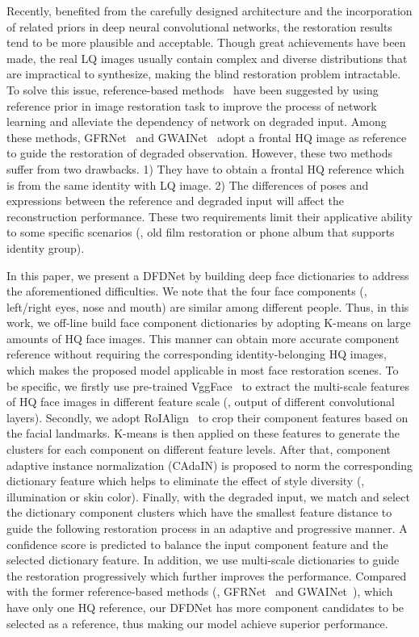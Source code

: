 \documentclass[runningheads]{llncs}
\begin{document}
Recently, benefited from the carefully designed architecture and the incorporation of related priors in deep neural convolutional networks, the restoration results tend to be more plausible and acceptable. Though great achievements have been made, the real LQ images usually contain complex and diverse distributions that are impractical to synthesize, making the blind restoration problem intractable.
To solve this issue, reference-based methods~\cite{li2018learning,dogan2019exemplar,wang2018recovering,zhang2019image} have been suggested by using reference prior in image restoration task to improve the process of network learning and alleviate the dependency of network on degraded input. 
Among these methods, GFRNet~\cite{li2018learning} and GWAINet~\cite{dogan2019exemplar} adopt a frontal HQ image as reference to guide the restoration of degraded observation. However, these two methods suffer from two drawbacks. 
1) They have to obtain a frontal HQ reference which is from the same identity with LQ image.
2) The differences of poses and expressions between the reference and degraded input will affect the reconstruction performance. 
These two requirements limit their applicative ability to some specific scenarios 
(\eg, old film restoration or phone album that supports identity group). 

In this paper, we present a DFDNet by building deep face dictionaries to address the aforementioned difficulties. 
We note that the four face components (\ie, left/right eyes, nose and mouth) are similar among different people. 
Thus, in this work, we  off-line build face component dictionaries by adopting K-means on large amounts of HQ face images. This manner can obtain more accurate component reference without requiring the corresponding identity-belonging HQ images, 
which makes the proposed model applicable in most face restoration scenes. 
To be specific, we firstly use pre-trained VggFace~\cite{cao2018vggface2} to extract the multi-scale features of HQ face images in different feature scale (\eg, output of different  convolutional layers). Secondly, we adopt RoIAlign~\cite{he2017mask} to crop their component features based on the facial landmarks. K-means is then applied on these features to generate the  clusters for each component on different feature levels. 
After that, component adaptive instance normalization (CAdaIN) is proposed to norm the corresponding dictionary feature which helps to eliminate the effect of style diversity (\ie, illumination or skin color).
Finally, with the degraded input, we match and select the dictionary component clusters which have the smallest feature distance to guide the following restoration process in an adaptive and progressive manner. 
A confidence score is predicted to balance the input component feature and the selected dictionary feature.
In addition, we use multi-scale dictionaries to guide the restoration progressively which further improves the performance.
Compared with the former reference-based methods (\ie, GFRNet~\cite{li2018learning} and GWAINet~\cite{dogan2019exemplar}), which have only one HQ reference, our DFDNet has more component candidates to be selected as a reference, thus making our model achieve superior performance.  
\end{document}
